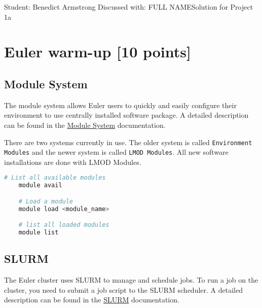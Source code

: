 \documentclass[unicode,11pt,a4paper,oneside,numbers=endperiod,openany]{scrartcl}
\begin{document}
\setassignment
{}

{Student: Benedict Armstrong}
{Discussed with: FULL NAME}{Solution for Project 1a}{}
\newline


\section{Euler warm-up [10 points]}

\subsection{Module System}

The module system allows Euler users to quickly and easily configure their environment to use centrally installed software package. A detailed description can be found in the \href{https://scicomp.ethz.ch/wiki/Modules_and_applications}{Module System} documentation.

There are two systems currently in use. The older system is called \texttt{Environment Modules} and the newer system is called \texttt{LMOD Modules}. All new software installations are done with LMOD Modules.

\begin{lstlisting}[language=bash,caption={Euler module system}]
    # List all available modules
    module avail

    # Load a module
    module load <module_name>

    # list all loaded modules
    module list
\end{lstlisting}

\subsection{SLURM}

The Euler cluster uses SLURM to manage and schedule jobs. To run a job on the cluster, you need to submit a job script to the SLURM scheduler. A detailed description can be found in the \href{https://scicomp.ethz.ch/wiki/Job_management_with_SLURM}{SLURM} documentation.
\end{document}
